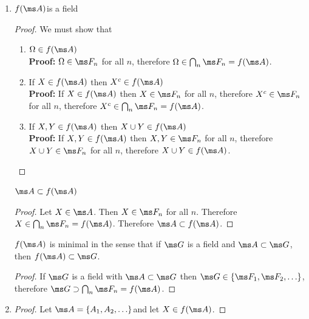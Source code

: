 \begin{enumerate}
  \begin{enumerate}[label=(\alph*)]

  \item
    \begin{claim*}
      $f(\ms A)$is a field
    \end{claim*}
    \begin{proof}
      We must show that
      \begin{enumerate}
      \item $\Omega \in f(\ms A)$\\
        {\bf Proof:} $\Omega \in \ms F_n$ for all $n$, therefore $\Omega \in \bigcap_{n}\ms F_n = f(\ms A)$.

      \item If $X \in f(\ms A)$ then $X^c \in f(\ms A)$\\
        {\bf Proof:} If $X \in f(\ms A)$ then $X \in \ms F_n$ for all $n$, therefore $X^c \in \ms F_n$ for all $n$, therefore $X^c \in \bigcap_{n}\ms F_n = f(\ms A)$.

      \item If $X, Y \in f(\ms A)$ then $X \cup Y \in f(\ms A)$\\
        {\bf Proof:} If $X, Y \in f(\ms A)$ then $X, Y \in \ms F_n$ for all $n$, therefore $X \cup Y \in \ms F_n$ for all $n$, therefore $X \cup Y \in f(\ms A)$.
      \end{enumerate}
    \end{proof}

    \begin{claim*}
      $\ms A \subset f(\ms A)$
    \end{claim*}
    \begin{proof}
      Let $X \in \ms A$. Then $X \in \ms F_n$ for all $n$. Therefore $X \in \bigcap_{n}\ms F_n = f(\ms A)$. Therefore $\ms A \subset f(\ms A)$.
    \end{proof}

    \begin{claim*}
      $f(\ms A)$ is minimal in the sense that if $\ms G$ is a field and $\ms A \subset \ms G$, then $f(\ms A) \subset \ms G$.
    \end{claim*}
    \begin{proof}
      If $\ms G$ is a field with $\ms A \subset \ms G$ then $\ms G \in \{\ms F_1, \ms F_2, \ldots\}$, therefore $\ms G \supset \bigcap_{n}\ms F_n = f(\ms A)$.
    \end{proof}

  \item
    \begin{proof}
      Let $\ms A = \{A_1, A_2, \ldots\}$and let $X \in f(\ms A)$.


\end{proof}
\end{enumerate}
\end{enumerate}
